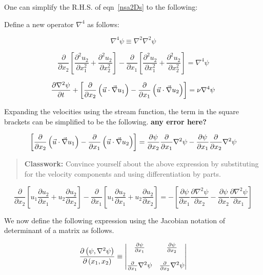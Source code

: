 One can simplify the R.H.S. of eqn~\ref{nsa2Ds} to the following:

Define a new operator $\nabla^4$ as follows:

$$ \nabla^4 \psi \equiv \nabla^2 \nabla^2 \psi$$

\begin{equation} 
\label{nsa2Ds2}
\frac{\partial}{\partial x_2} \left[ \frac{\partial^2 u_2}{\partial x_1^2} + \frac{\partial^2 u_2}{\partial x_2^2} \right] - \frac{\partial}{\partial x_1} \left[ \frac{\partial^2 u_2}{\partial x_1^2} + \frac{\partial^2 u_2}{\partial x_2^2} \right] = \nabla^4 \psi
\end{equation} 

$$ {\partial \nabla^2 \psi \over \partial t} + \left[ {\partial \over \partial x_2} \left( \vec{u}\cdot \vec{\nabla} u_1 \right) - {\partial \over \partial x_1}\left( \vec{u}\cdot \vec{\nabla} u_2 \right) 	\right] = \nu \nabla^4 \psi $$ 


Expanding the velocities using the stream function, the term in the square brackets can be simplified to be the following.
{\bf any error here?}

$$\left[ {\partial \over \partial x_2} \left( \vec{u}\cdot \vec{\nabla} u_1 \right) - {\partial  \over \partial x_1}\left( \vec{u}\cdot \vec{\nabla} u_2 \right)	\right] = {\partial \psi \over \partial x_2} {\partial \over \partial x_1} \nabla^2 \psi - {\partial \psi \over \partial x_1} {\partial \over \partial x_2} \nabla^2 \psi $$

\begin{quote}
{\bf Classwork:} Convince yourself about the above expression by substituting for the velocity components and using differentiation by parts.
\end{quote}

\begin{equation}
\frac{\partial}{\partial x_2} \left[ u_1\frac{\partial u_2}{\partial x_1} + u_2\frac{\partial u_2}{\partial x_2} \right] - \frac{\partial}{\partial x_1} \left[u_1\frac{\partial u_2}{\partial x_1} + u_2\frac{\partial u_2}{\partial x_2} \right] = - \left[ \frac{\partial \psi}{\partial x_1} \frac{\partial \nabla^2 \psi}{\partial x_2} - \frac{\partial \psi}{\partial x_2} \frac{\partial \nabla^2 \psi}{\partial x_1} \right]
\end{equation}


We now define the following expression using the Jacobian notation of determinant of a matrix as follows.

\begin{equation*}
 {\partial \left( \psi, \nabla^2 \psi \right) \over \partial \left( x_1, x_2 \right) } \equiv
\begin{vmatrix}
{\partial \psi \over \partial x_1} & {\partial \psi \over \partial x_2} \\
\ \\
{\partial \over \partial x_1} \nabla^2 \psi & {\partial \over \partial x_2} \nabla^2 \psi \\
\end{vmatrix}
\end{equation*}



